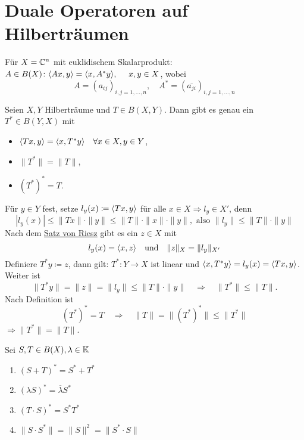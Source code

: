 


\section{Duale Operatoren auf Hilberträumen}



Für $X = \mathbb{C}^{n}$ mit euklidischem Skalarprodukt: \\
$A \in B(X) \colon \< A x , y \> = \< x , A^{*} y \>, \quad x, y \in X$, wobei
\[ A = (a_{ij})_{i, j = 1, \dotsc, n}, \quad A^{*} = (\overline{a_{ji}})_{i, j = 1, \dotsc, n} \]


\begin{satz}
	Seien $X, Y$ Hilberträume und $T \in B(X, Y)$. Dann gibt es genau ein $T^{*} \in B(Y, X)$ mit
	\begin{itemize}
		\item $\langle T x , y \rangle = \langle x , T^{*} y \rangle \quad \forall x \in X, y \in Y$,
		\item $\| T^{*} \| = \| T \|$,
		\item $\left(T	^{*}\right)^{*} = T$.
	\end{itemize}	
\end{satz}

\begin{beweis}
	Für $y \in Y$ fest, setze $l_{y}(x) \coloneqq \langle T x , y \rangle$ für alle $x \in X \Rightarrow l_{y} \in X'$, denn
	\[ | l_{y}(x) | \leq \| T x \| \cdot \| y \| \leq \|T \| \cdot \| x \| \cdot \| y \|, \text{ also } \| l_{y} \| \leq \| T \| \cdot \| y \| \]
	Nach dem \hyperref[satz:17.2-Riesz]{Satz von Riesz} gibt es ein $z \in X$ mit
	\[ l_{y} (x) = \langle x , z \rangle \quad \text{und} \quad \| z \|_{X} = \| l_{y} \|_{X'} \]
	Definiere $T^{*} y \coloneqq z$, dann gilt: $T^{*} \colon Y \rightarrow X$ ist linear und $\langle x , T^{*} y \rangle = l_{y}(x) = \langle T x , y \rangle$. \\
	Weiter ist 
	\[ \| T^{*} y \| = \| z \| = \| l_{y} \| \leq \| T \| \cdot \| y \| \quad \Rightarrow \quad \| T^{*} \| \leq \| T \|. \]
	Nach Definition ist 
	\[ \left( T^{*} \right)^{*} = T \quad \Rightarrow \quad \| T \| = \| \left( T^{*} \right)^{*} \| \leq \| T^{*} \| \]
	$\Rightarrow \| T^{*} \| = \| T \|$. 
\end{beweis}


\begin{bemerkung} \label{bem:19.2}
	Sei $S, T \in B(X), \lambda \in \mathbb{K}$
	\begin{enumerate}[label=\alph*\upshape)]
		\item $\left( S + T \right)^{*} = S^{*} + T^{*}$
		\item $\left( \lambda S \right)^{*} = \overline{\lambda} S^{*}$
		\item $\left( T \cdot S \right)^{*} = S^{*} T^{*}$
		\item $\| S \cdot S^{*} \| = \| S \|^{2} = \| S^{*} \cdot S \|$
	\end{enumerate}
\end{bemerkung}


